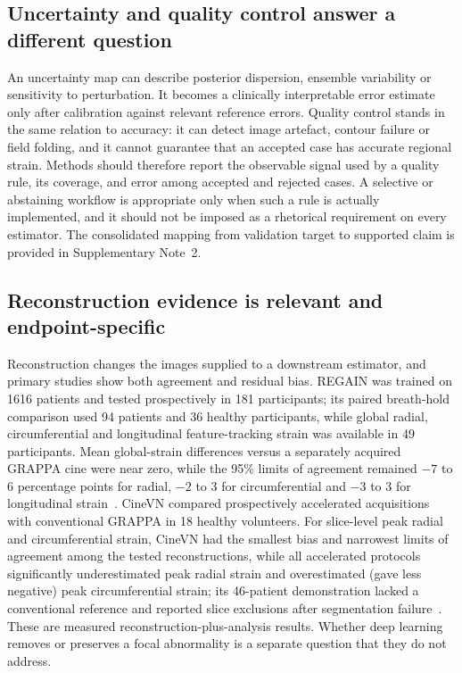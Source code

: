 \subsection{Uncertainty and quality control answer a different question}

An uncertainty map can describe posterior dispersion, ensemble variability or sensitivity to perturbation. It becomes a clinically interpretable error estimate only after calibration against relevant reference errors. Quality control stands in the same relation to accuracy: it can detect image artefact, contour failure or field folding, and it cannot guarantee that an accepted case has accurate regional strain. Methods should therefore report the observable signal used by a quality rule, its coverage, and error among accepted and rejected cases. A selective or abstaining workflow is appropriate only when such a rule is actually implemented, and it should not be imposed as a rhetorical requirement on every estimator. The consolidated mapping from validation target to supported claim is provided in Supplementary Note~2.

\subsection{Reconstruction evidence is relevant and endpoint-specific}

Reconstruction changes the images supplied to a downstream estimator, and primary studies show both agreement and residual bias. REGAIN was trained on 1616 patients and tested prospectively in 181 participants; its paired breath-hold comparison used 94 patients and 36 healthy participants, while global radial, circumferential and longitudinal feature-tracking strain was available in 49 participants. Mean global-strain differences versus a separately acquired GRAPPA cine were near zero, while the 95\% limits of agreement remained \(-7\) to 6 percentage points for radial, \(-2\) to 3 for circumferential and \(-3\) to 3 for longitudinal strain~\cite{yoon2023regain}. CineVN compared prospectively accelerated acquisitions with conventional GRAPPA in 18 healthy volunteers. For slice-level peak radial and circumferential strain, CineVN had the smallest bias and narrowest limits of agreement among the tested reconstructions, while all accelerated protocols significantly underestimated peak radial strain and overestimated (gave less negative) peak circumferential strain; its 46-patient demonstration lacked a conventional reference and reported slice exclusions after segmentation failure~\cite{vornehm2024cinevn}. These are measured reconstruction-plus-analysis results. Whether deep learning removes or preserves a focal abnormality is a separate question that they do not address.

